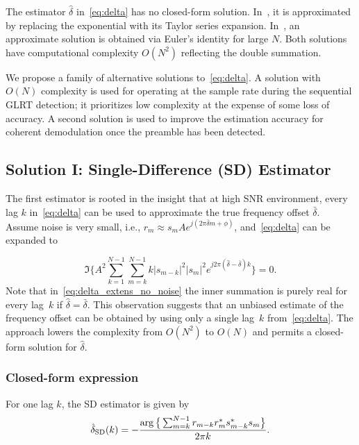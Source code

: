 The estimator $\hat{\delta}$ in~\eqref{eq:delta} has no closed-form
solution.
In~\cite{Luise_Reggiannini_95}, it is approximated by replacing the exponential with its
Taylor series expansion.
In~\cite{Fitz_94}, an approximate solution is obtained via Euler's
identity for large $N$.
Both solutions have computational complexity $O(N^2)$ reflecting the
double summation.

We propose a family of alternative solutions to~\eqref{eq:delta}.
A solution with $O(N)$ complexity is used for operating at the sample
rate during the sequential GLRT detection;
it prioritizes low complexity at the expense of some loss of accuracy.
A second solution is used to improve the estimation accuracy for coherent demodulation once the preamble has been detected.

\subsection{Solution I: Single-Difference (SD) Estimator}

The first estimator is rooted in the insight that at high SNR environment, every lag $k$ in~\eqref{eq:delta} can be used to
approximate the true frequency offset $\bar{\delta}$. Assume noise is very small, i.e.,
$r_m \approx s_mAe^{j(2\pi \bar{\delta} m+\phi)}$, and~\eqref{eq:delta} can be expanded to

\begin{equation}
    \label{eq:delta_extens_no_noise}
    \Im\bigg\{A^2\sum_{k=1}^{N-1}\sum_{m=k}^{N-1}k|s_{m-k}|^2|s_m|^2e^{j2\pi (\hat{\delta}-\bar{\delta})k}\bigg\}=0.
    \end{equation}
Note that in~\eqref{eq:delta_extens_no_noise} the inner summation is purely real for every lag~$k$ if $\hat{\delta}=\bar{\delta}$.
This observation suggests that an unbiased estimate of the frequency offset can be obtained by using only a single lag~$k$
from~\eqref{eq:delta}. The approach lowers the complexity from $O(N^2)$ to $O(N)$ and permits a closed-form solution for $\hat{\delta}$.  

\subsubsection{Closed-form expression} 
For one lag $k$, the SD estimator is given by
\begin{equation}
    \label{eq:delta_SD}
    \hat{\delta}_{\text{SD}}(k)=-\frac{\arg\big\{\sum_{m=k}^{N-1}r_{m-k}r_m^*s_{m-k}^*s_m\big\}}{2\pi k}.
\end{equation}

